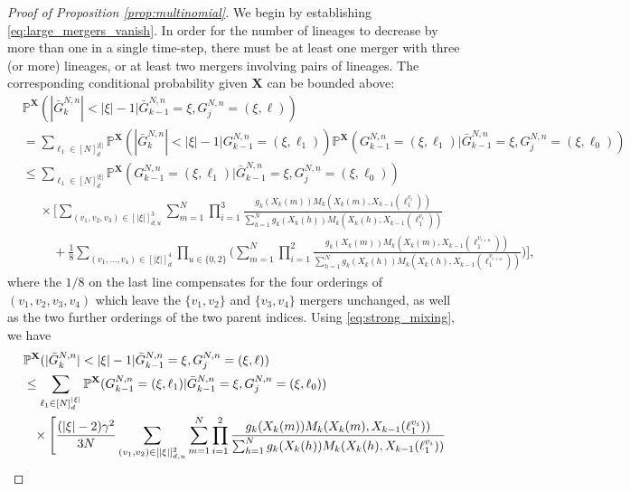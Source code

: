 \documentclass[a4paper,11pt]{article}
\theoremstyle{definition}
\newcommand{\bbP}{\mathbb{P}}
\newcommand{\bfX}{\mathbf{X}}
\begin{document}
\begin{proof}[Proof of Proposition \ref{prop:multinomial}]
We begin by establishing \eqref{eq:large_mergers_vanish}. 
In order for the number of lineages to decrease by more than one in a single time-step, there must be at least one merger with three (or more) lineages, or at least two mergers involving pairs of lineages.
The corresponding conditional probability given $\bfX$ can be bounded above:
\begin{align*}
&\bbP^{ \bfX }( | \bar{ G }_k^{ N, n } | < | \xi | - 1 | \bar{ G }_{ k - 1 }^{ N, n } = \xi, G_j^{ N, n } = ( \xi, \ell ) ) \\
&= \sum_{ \ell_1 \in [ N ]_d^{ | \xi | } } \bbP^{ \bfX }( | \bar{ G }_k^{ N, n } | < | \xi | - 1 | G_{ k - 1 }^{ N, n } = ( \xi, \ell_1 ) ) \bbP^{ \bfX }( G_{ k - 1 }^{ N, n } = ( \xi, \ell_1 ) | \bar{ G }_{ k - 1 }^{ N, n } = \xi,  G_j^{ N, n } = ( \xi, \ell_0 ) ) \\
&\leq \sum_{ \ell_1 \in [ N ]_d^{ | \xi | } } \bbP^{ \bfX }( G_{ k - 1 }^{ N, n } = ( \xi, \ell_1 ) | \bar{ G }_{ k - 1 }^{ N, n } = \xi, G_j^{ N, n } = ( \xi, \ell_0 ) ) \\
&\phantom{ \leq } \times \Bigg[ \sum_{ ( v_1, v_2, v_3 ) \in [ | \xi | ]_{ d, u }^3 } \sum_{ m = 1 }^N \prod_{ i = 1 }^3 \frac{ g_k( X_k( m ) ) M_k( X_k( m ), X_{ k - 1 }( \ell_1^{ v_i } ) ) }{ \sum_{ h = 1 }^N g_k( X_k( h ) ) M_k( X_k( h ), X_{ k - 1 }( \ell_1^{ v_i } ) ) } \\
&\phantom{ \leq \times \Bigg[ } + \frac{ 1 }{ 8 } \sum_{ ( v_1, \ldots, v_4 ) \in [ | \xi | ]_d^4 } \prod_{ u \in \{ 0, 2 \} } \Bigg( \sum_{ m = 1 }^N \prod_{ i = 1 }^2 \frac{ g_k( X_k( m ) ) M_k( X_k( m ), X_{ k - 1 }( \ell_1^{ v_{ i + u } } ) ) }{ \sum_{ h = 1 }^N g_k( X_k( h ) ) M_k( X_k( h ), X_{ k - 1 }( \ell_1^{ v_{ i + u } } ) ) } \Bigg) \Bigg],
\end{align*}
where the $1/8$ on the last line compensates for the four orderings of $( v_1, v_2, v_3, v_4)$ which leave the $\{ v_1, v_2 \}$ and $\{ v_3, v_4 \}$ mergers unchanged, as well as the two further orderings of the two parent indices.
Using \eqref{eq:strong_mixing}, we have
\begin{align}
&\bbP^{ \bfX }( | \bar{ G }_k^{ N, n } | < | \xi | - 1 | \bar{ G }_{ k - 1 }^{ N, n } = \xi, G_j^{ N, n } = ( \xi, \ell ) ) \notag \\
&\leq \sum_{ \ell_1 \in [ N ]_d^{ | \xi | } } \bbP^{ \bfX }( G_{ k - 1 }^{ N, n } = ( \xi, \ell_1 ) | \bar{ G }_{ k - 1 }^{ N, n } = \xi, G_j^{ N, n } = ( \xi, \ell_0 ) ) \notag \\
&\phantom{ \leq } \times \Bigg[ \frac{ ( | \xi | - 2 ) \gamma^2 }{ 3 N } \sum_{ ( v_1, v_2 ) \in [ | \xi | ]_{ d, u }^2 } \sum_{ m = 1 }^N \prod_{ i = 1 }^2 \frac{ g_k( X_k( m ) ) M_k( X_k( m ), X_{ k - 1 }( \ell_1^{ v_i } ) ) }{ \sum_{ h = 1 }^N g_k( X_k( h ) ) M_k( X_k( h ), X_{ k - 1 }( \ell_1^{ v_i } ) ) } \notag \\

\end{align}
\end{proof}
\end{document}
